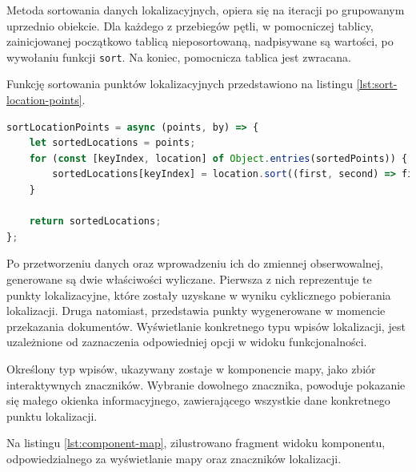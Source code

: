 Metoda sortowania danych lokalizacyjnych, opiera się na iteracji po grupowanym uprzednio obiekcie. Dla każdego z przebiegów pętli, w pomocniczej tablicy, zainicjowanej początkowo tablicą nieposortowaną, nadpisywane są wartości, po wywołaniu funkcji \texttt{sort}. Na koniec, pomocnicza tablica jest zwracana.

Funkcję sortowania punktów lokalizacyjnych przedstawiono na listingu \ref{lst:sort-location-points}.

\begin{lstlisting}[label=lst:sort-location-points,caption=Kod metody sortującej uzyskane punkty lokalizacyjne, captionpos=b,basicstyle=\footnotesize\ttfamily,language=JavaScript]
sortLocationPoints = async (points, by) => {
	let sortedLocations = points;
	for (const [keyIndex, location] of Object.entries(sortedPoints)) {
		sortedLocations[keyIndex] = location.sort((first, second) => first[by].localeCompare(second[by]));
	}

	return sortedLocations;
};
\end{lstlisting}

Po przetworzeniu danych oraz wprowadzeniu ich do zmiennej obserwowalnej, generowane są dwie właściwości wyliczane. Pierwsza z nich reprezentuje te punkty lokalizacyjne, które zostały uzyskane w wyniku cyklicznego pobierania lokalizacji. Druga natomiast, przedstawia punkty wygenerowane w momencie przekazania dokumentów. Wyświetlanie konkretnego typu wpisów lokalizacji, jest uzależnione od zaznaczenia odpowiedniej opcji w widoku funkcjonalności.

Określony typ wpisów, ukazywany zostaje w komponencie mapy, jako zbiór interaktywnych znaczników. Wybranie dowolnego znacznika, powoduje pokazanie się małego okienka informacyjnego, zawierającego wszystkie dane konkretnego punktu lokalizacji.

Na listingu \ref{lst:component-map}, zilustrowano fragment widoku komponentu, odpowiedzialnego za wyświetlanie mapy oraz znaczników lokalizacji.

